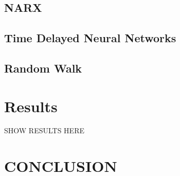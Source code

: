 \documentclass{acm_proc_article-sp}
\begin{document}
\subsection{NARX}

\subsection{Time Delayed Neural Networks}

\subsection{Random Walk}


\section{Results}
SHOW RESULTS HERE

\section{CONCLUSION}

%
%
\balancecolumns
\end{document}
